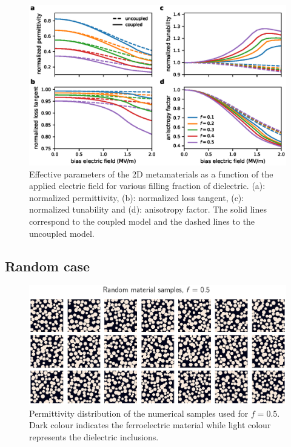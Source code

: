 \documentclass[openacc]{rsproca_new}%
\begin{document}
\begin{figure}[!t]
 \centering
 \includegraphics[width=1\textwidth]{effpar_per}
 \caption{Effective parameters of the 2D metamaterials as a function of the
  applied electric field for various filling fraction of dielectric.
  (a): normalized permittivity, (b): normalized loss tangent, (c): normalized tunability and
  (d): anisotropy factor. The solid lines correspond to the coupled model and
  the dashed lines to the uncoupled model.}
 \label{eff_par_2D_TM}
\end{figure}

\subsection{Random case}
\begin{figure}
 \centering
 \includegraphics[width=0.8\columnwidth]{randmatepsi}
 \caption{Permittivity distribution of the numerical samples used for $f=0.5$. Dark
  colour indicates the ferroelectric material while light colour represents the
  dielectric inclusions.}
 \label{randmatepsi}
\end{figure}
\end{document}
